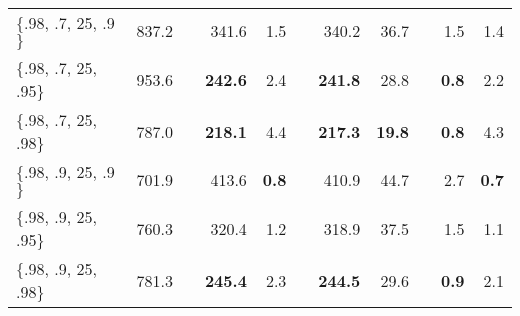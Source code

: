 \documentclass[ba]{imsart}
\numberwithin{equation}{section}
\theoremstyle{plain}
\begin{document}
\begin{table}[!t]
{\begin{tabular}{lrlrrlrrlrr}
\hline
$\{$.98, .7, 25, .9$\}$  & 837.2  &   & 341.6         & 1.5         &   & 340.2      & 36.7        &   & 1.5         & 1.4         \\
$\{$.98, .7, 25, .95$\}$ & 953.6  &   & \textbf{ 242.6}         & 2.4         &   & \textbf{ 241.8}      & 28.8        &   & \textbf{ 0.8}         & 2.2         \\
$\{$.98, .7, 25, .98$\}$ & 787.0  &   & \textbf{ 218.1}         & 4.4         &   & \textbf{ 217.3}      & \textbf{ 19.8}        &   & \textbf{ 0.8}         & 4.3         \\
$\{$.98, .9, 25, .9$\}$  & 701.9  &   & 413.6         & \textbf{ 0.8}         &   & 410.9      & 44.7        &   & 2.7         & \textbf{ 0.7}         \\
$\{$.98, .9, 25, .95$\}$ & 760.3  &   & 320.4         & 1.2         &   & 318.9      & 37.5        &   & 1.5         & 1.1         \\
$\{$.98, .9, 25, .98$\}$ & 781.3  &   & \textbf{ 245.4}         & 2.3         &   & \textbf{ 244.5}      & 29.6        &   & \textbf{ 0.9}         & 2.1     \\  
\hline\hline 
\end{tabular}}
\end{table}
\end{document}
